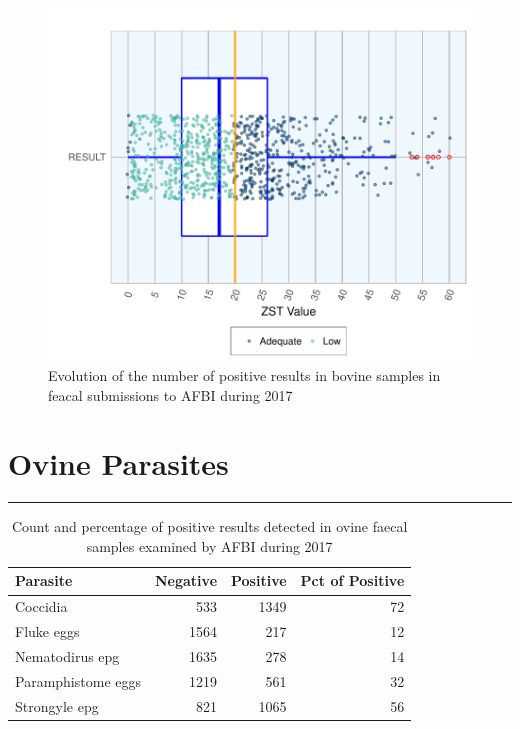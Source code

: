 \documentclass[]{book}
\begin{document}
\begin{figure}

{\centering \includegraphics{AFBI_files/figure-latex/unnamed-chunk-74-1} 

}

\caption{Evolution of the number of positive results in bovine  samples in feacal submissions to AFBI during 2017}\label{fig:unnamed-chunk-74}
\end{figure}

\chapter{Ovine Parasites}\label{ovine-parasites}

\begin{center}\rule{0.5\linewidth}{\linethickness}\end{center}

\begin{table}

\caption{\label{tab:unnamed-chunk-78}Count  and percentage of positive results detected in ovine faecal samples examined by AFBI during 2017}
\centering
\begin{tabular}[t]{l|r|r|r}
\hline
Parasite & Negative & Positive & Pct of Positive\\
\hline
Coccidia & 533 & 1349 & 72\\
\hline
Fluke eggs & 1564 & 217 & 12\\
\hline
Nematodirus epg & 1635 & 278 & 14\\
\hline
Paramphistome eggs & 1219 & 561 & 32\\
\hline
Strongyle epg & 821 & 1065 & 56\\
\hline
\end{tabular}
\end{table}
\end{document}
